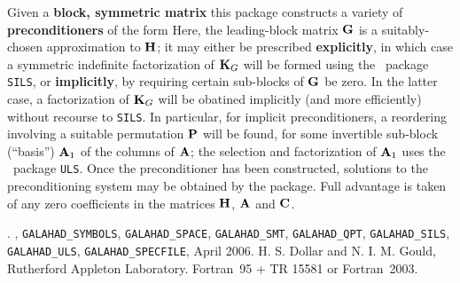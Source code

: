 \documentclass{galahad}
\newcommand{\packagename}{SBLS}
\newcommand{\fullpackagename}{\libraryname\_\packagename}
\begin{document}
\galheader


\galsummary
Given a {\bf block, symmetric matrix}
this package constructs a variety of {\bf preconditioners} of the form
Here, the leading-block matrix ${\mathbf{G}}$ is a suitably-chosen
approximation to ${\mathbf{H}}$; it may either be prescribed {\bf explicitly}, in
which case a symmetric indefinite factorization of ${\mathbf{K}}_{G}$
will be formed using the \galahad\ package {\tt SILS},
or {\bf implicitly}, by requiring certain sub-blocks of ${\mathbf{G}}$
be zero. In the latter case, a factorization of ${\mathbf{K}}_{G}$ will be
obatined implicitly (and more efficiently) without recourse to {\tt SILS}.
In particular, for implicit preconditioners, a reordering
involving a suitable permutation ${\mathbf{P}}$ will be found, for some
invertible sub-block (``basis'') ${\mathbf{A}}_1$ of the columns of ${\mathbf{A}}$;
the selection and factorization of ${\mathbf{A}}_1$ uses
the \galahad\ package {\tt ULS}.
Once the preconditioner has been constructed,
solutions to the preconditioning system
may be obtained by the package.
Full advantage is taken of any zero coefficients in the matrices ${\mathbf{H}}$,
${\mathbf{A}}$ and ${\mathbf{C}}$.


\galattributes
\galversions{\tt  \fullpackagename\_single, \fullpackagename\_double}.
,
{\tt GALAHAD\_SY\-M\-BOLS},
{\tt GALAHAD\-\_SPACE},
{\tt GALAHAD\_SMT},
{\tt GALAHAD\_QPT},
{\tt GALAHAD\_SILS},
{\tt GALAHAD\_ULS},
{\tt GALAHAD\_SPECFILE},
\galdate April 2006.
\galorigin \linebreak H. S. Dollar and N. I. M. Gould,
Rutherford Appleton Laboratory.
\gallanguage Fortran~95 + TR 15581 or Fortran~2003.

\end{document}
